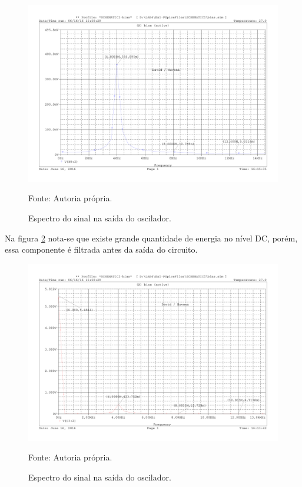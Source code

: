 \begin{figure}[H]
    \centering
    \caption{Espectro do sinal na saída do oscilador.}\label{fig:fftout}
    \includegraphics[scale=0.5]{Imagens/fftout}
    
    \small Fonte: Autoria própria.
\end{figure}

Na figura \ref{fig:fftosc} nota-se que existe grande quantidade de energia no nível DC, porém, essa componente é filtrada antes da saída do circuito.

\begin{figure}[H]
    \centering
    \caption{Espectro do sinal na saída do oscilador.}\label{fig:fftosc}
    \includegraphics[scale=0.5]{Imagens/fftosc}
    
    \small Fonte: Autoria própria.
\end{figure}

